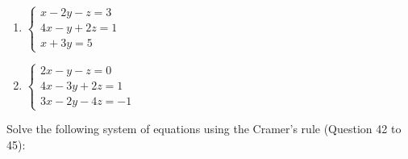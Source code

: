 \documentclass{report}
\begin{document}
\begin{multicols}{2}
\begin{enumerate}[wide, labelwidth=!, labelindent=0pt]
        \item $\begin{cases}
                      x - 2y - z = 3  \\
                      4x - y + 2z = 1 \\
                      x + 3y = 5
                  \end{cases}$

        \item $\begin{cases}
                      2x - y - z = 0   \\
                      4x - 3y + 2z = 1 \\
                      3x - 2y - 4z = -1
                  \end{cases}$

    \end{enumerate}

    \noindent Solve the following system of equations using the Cramer's rule (Question 42 to 45):

    \begin{enumerate}[wide, labelwidth=!, labelindent=0pt]
        \setcounter{enumi}{41}


\end{enumerate}
\end{multicols}
\end{document}
